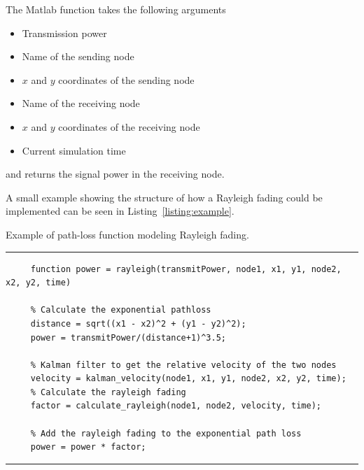 \documentclass[final,twoside]{rapport}
\begin{document}
The Matlab function takes the following arguments
\begin{itemize}
\item Transmission power
\item Name of the sending node
\item $x$ and $y$ coordinates of the sending node
\item Name of the receiving node
\item $x$ and $y$ coordinates of the receiving node
\item Current simulation time
\end{itemize}
and returns the signal power in the receiving node. 

A small example showing the structure of how a Rayleigh fading could
be implemented can be seen in Listing~\ref{listing:example}.




\begin{listing}[b]\footnotesize %
  \caption{Example of path-loss function modeling Rayleigh fading.}
  \label{listing:example}
  \vspace{3mm}
  \hrule
\begin{verbatim}
     function power = rayleigh(transmitPower, node1, x1, y1, node2, x2, y2, time)

     % Calculate the exponential pathloss
     distance = sqrt((x1 - x2)^2 + (y1 - y2)^2);
     power = transmitPower/(distance+1)^3.5;

     % Kalman filter to get the relative velocity of the two nodes
     velocity = kalman_velocity(node1, x1, y1, node2, x2, y2, time);
     % Calculate the rayleigh fading 
     factor = calculate_rayleigh(node1, node2, velocity, time);

     % Add the rayleigh fading to the exponential path loss
     power = power * factor;

\end{verbatim}
  \hrule
\end{listing}
\end{document}

